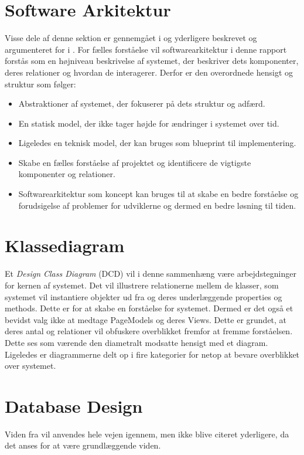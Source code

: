 \section{Software Arkitektur}
\label{sec:software-arkitektur}
Visse dele af denne sektion er gennemgået i  og yderligere beskrevet og argumenteret for i . 
For fælles forståelse vil softwarearkitektur i denne rapport forstås som en højniveau beskrivelse af systemet, der beskriver dets komponenter, deres relationer og hvordan de interagerer. 
Derfor er den overordnede hensigt og struktur som følger:
\begin{itemize}
    \item Abstraktioner af systemet, der fokuserer på dets struktur og adfærd.
    \item En statisk model, der ikke tager højde for ændringer i systemet over tid.
    \item Ligeledes en teknisk model, der kan bruges som blueprint til implementering.
    \item Skabe en fælles forståelse af projektet og identificere de vigtigste komponenter og relationer.
    \item Softwarearkitektur som koncept kan bruges til at skabe en bedre forståelse og forudsigelse af problemer for udviklerne og dermed en bedre løsning til tiden.
\end{itemize}

\section{Klassediagram}
\label{sec:class-diagram}
Et \emph{Design Class Diagram} (DCD) vil i denne sammenhæng være arbejdstegninger for kernen af systemet. Det vil illustrere relationerne mellem de klasser, som systemet vil instantiere objekter ud fra og deres underlæggende properties og methods. 
Dette er for at skabe en forståelse for systemet. Dermed er det også et bevidst valg ikke at medtage PageModels og deres Views. Dette er grundet, at deres antal og relationer vil obfuskere overblikket fremfor at fremme forståelsen. 
Dette ses som værende den diametralt modsatte hensigt med et diagram. Ligeledes er diagrammerne delt op i fire kategorier for netop at bevare overblikket over systemet.

\section{Database Design}
\label{sec:database-design}
Viden fra \cite{connolly2023database} vil anvendes hele vejen igennem, men ikke blive citeret yderligere, da det anses for at være grundlæggende viden.

